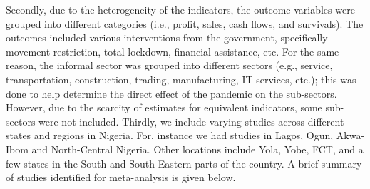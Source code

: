 \documentclass[a4paper, 12pt]{article}
\begin{document}
    \begin{table}[H]
        \centering
        \caption{Keywords and search results}
        \label{tab1:keywords-search-results}
    \end{table}

    Secondly, due to the heterogeneity of the indicators, the outcome variables were grouped into different categories (i.e., profit, sales, cash flows, and survivals). The outcomes included various interventions from the government, specifically movement restriction, total lockdown, financial assistance, etc. For the same reason, the informal sector was grouped into different sectors (e.g., service, transportation, construction, trading, manufacturing, IT services, etc.); this was done to help determine the direct effect of the pandemic on the sub-sectors. However, due to the scarcity of estimates for equivalent indicators, some sub-sectors were not included. Thirdly, we include varying studies across different states and regions in Nigeria. For, instance we had studies in Lagos, Ogun, Akwa-Ibom and North-Central Nigeria. Other locations include Yola, Yobe, FCT, and a few states in the South and South-Eastern parts of the country. A brief summary of studies identified for meta-analysis is given below.
\end{document}
